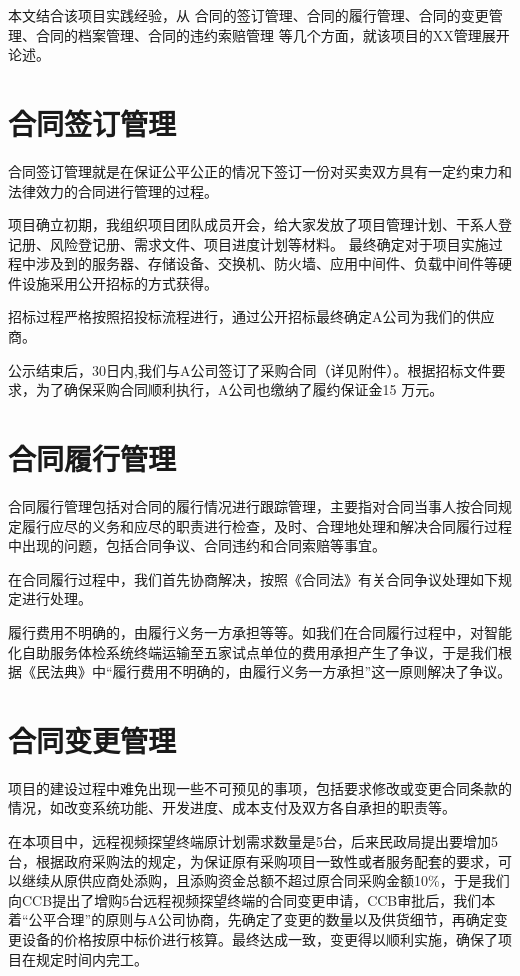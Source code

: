 \documentclass[UTF8]{../computerUniverse}
\begin{document}
本文结合该项目实践经验，从
合同的签订管理、合同的履行管理、合同的变更管理、合同的档案管理、合同的违约索赔管理
等几个方面，就该项目的XX管理展开论述。


\section{合同签订管理}

合同签订管理就是在保证公平公正的情况下签订一份对买卖双方具有一定约束力和法律效力的合同进行管理的过程。

项目确立初期，我组织项目团队成员开会，给大家发放了项目管理计划、干系人登记册、风险登记册、需求文件、项目进度计划等材料。
最终确定对于项目实施过程中涉及到的服务器、存储设备、交换机、防火墙、应用中间件、负载中间件等硬件设施采用公开招标的方式获得。

招标过程严格按照招投标流程进行，通过公开招标最终确定A公司为我们的供应商。

公示结束后，30日内,我们与A公司签订了采购合同（详见附件）。根据招标文件要求，为了确保采购合同顺利执行，A公司也缴纳了履约保证金15 万元。




\section{合同履行管理}

合同履行管理包括对合同的履行情况进行跟踪管理，主要指对合同当事人按合同规定履行应尽的义务和应尽的职责进行检查，及时、合理地处理和解决合同履行过程中出现的问题，包括合同争议、合同违约和合同索赔等事宜。

在合同履行过程中，我们首先协商解决，按照《合同法》有关合同争议处理如下规定进行处理。

履行费用不明确的，由履行义务一方承担等等。如我们在合同履行过程中，对智能化自助服务体检系统终端运输至五家试点单位的费用承担产生了争议，于是我们根据《民法典》中“履行费用不明确的，由履行义务一方承担”这一原则解决了争议。




\section{合同变更管理}
项目的建设过程中难免出现一些不可预见的事项，包括要求修改或变更合同条款的情况，如改变系统功能、开发进度、成本支付及双方各自承担的职责等。

在本项目中，远程视频探望终端原计划需求数量是5台，后来民政局提出要增加5台，根据政府采购法的规定，为保证原有采购项目一致性或者服务配套的要求，可以继续从原供应商处添购，且添购资金总额不超过原合同采购金额10\%，于是我们向CCB提出了增购5台远程视频探望终端的合同变更申请，CCB审批后，我们本着“公平合理”的原则与A公司协商，先确定了变更的数量以及供货细节，再确定变更设备的价格按原中标价进行核算。最终达成一致，变更得以顺利实施，确保了项目在规定时间内完工。
\end{document}
